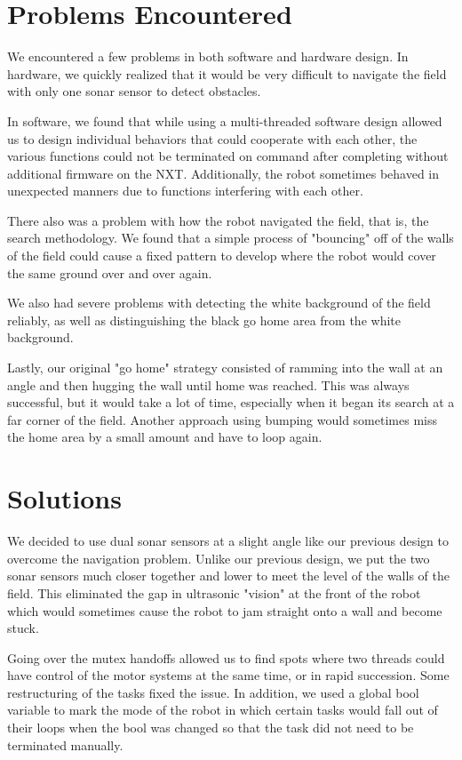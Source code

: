 \documentclass[journal]{IEEEtran}
\begin{document}
\section{Problems Encountered}\label{S.problems}
We encountered a few problems in both software and hardware design. In hardware, we quickly realized that it would be very difficult to navigate the field with only one sonar sensor to detect obstacles. 

In software, we found that while using a multi-threaded software design allowed us to design individual behaviors that could cooperate with each other, the various functions could not be terminated on command after completing without additional firmware on the NXT. Additionally, the robot sometimes behaved in unexpected manners due to functions interfering with each other.

There also was a problem with how the robot navigated the field, that is, the search methodology. We found that a simple process of "bouncing" off of the walls of the field could cause a fixed pattern to develop where the robot would cover the same ground over and over again. 

We also had severe problems with detecting the white background of the field reliably, as well as distinguishing the black go home area from the white background.

Lastly, our original "go home" strategy consisted of ramming into the wall at an angle and then hugging the wall until home was reached. This was always successful, but it would take a lot of time, especially when it began its search at a far corner of the field. Another approach using bumping would sometimes miss the home area by a small amount and have to loop again.

\section{Solutions}\label{S.solutions}
We decided to use dual sonar sensors at a slight angle like our previous design to overcome the navigation problem. Unlike our previous design, we put the two sonar sensors much closer together and lower to meet the level of the walls of the field. This eliminated the gap in ultrasonic "vision" at the front of the robot which would sometimes cause the robot to jam straight onto a wall and become stuck.

Going over the mutex handoffs allowed us to find spots where two threads could have control of the motor systems at the same time, or in rapid succession. Some restructuring of the tasks fixed the issue. In addition, we used a global bool variable to mark the mode of the robot in which certain tasks would fall out of their loops when the bool was changed so that the task did not need to be terminated manually.
\end{document}
